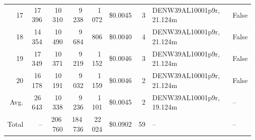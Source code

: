 \documentclass[a4paper,11pt]{article}
\begin{document}
\begin{table}[ht]
\begin{tabular}{r r r r r r r p{3cm} l}
17 & 17\,396 & 10\,310 & 9\,238 & 1\,072 & \$0.0045 & 3 & DENW39AL10001p9r, 21.124m & False \\
18 & 14\,354 & 10\,490 & 9\,684 & 806 & \$0.0040 & 4 & DENW39AL10001p9r, 21.124m & False \\
19 & 17\,349 & 10\,371 & 9\,219 & 1\,152 & \$0.0046 & 3 & DENW39AL10001p9r, 21.124m & False \\
20 & 16\,178 & 10\,191 & 9\,032 & 1\,159 & \$0.0046 & 2 & DENW39AL10001p9r, 21.124m & False \\
\hline
Avg. & 26\,643 & 10\,338 & 9\,236 & 1\,101 & \$0.0045 & 2 & DENW39AL10001p9r, 19.124m & -- \\
Total & -- & 206\,760 & 184\,736 & 22\,024 & \$0.0902 & 59 & -- & -- \\
\hline
\end{tabular}
\end{table}

\clearpage
\end{document}
